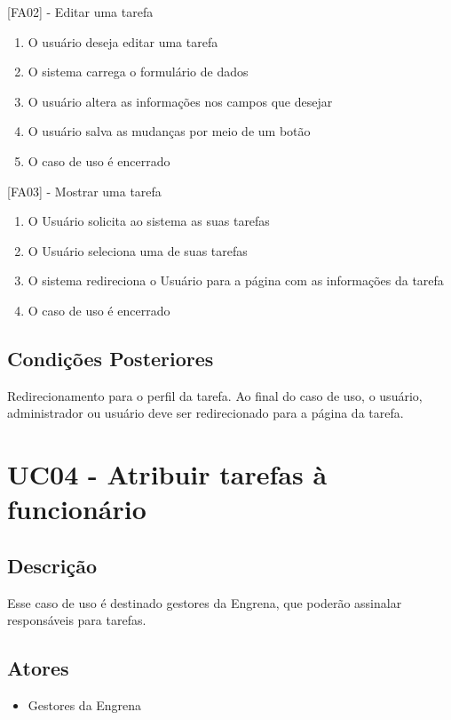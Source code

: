 [FA02] - Editar uma tarefa
\begin{enumerate}
  \item{O usuário deseja editar uma tarefa}
  \item{O sistema carrega o formulário de dados}
  \item{O usuário altera as informações nos campos que desejar}
  \item{O usuário salva as mudanças por meio de um botão}
  \item{O caso de uso é encerrado}
\end{enumerate}


[FA03] - Mostrar uma tarefa
\begin{enumerate}
  \item{O Usuário solicita ao sistema as suas tarefas}
  \item{O Usuário seleciona uma de suas tarefas}
  \item{O sistema redireciona o Usuário para a página com as informações da tarefa}
  \item{O caso de uso é encerrado}
\end{enumerate}


\subsection{Condições Posteriores}

Redirecionamento para o perfil da tarefa. Ao final do caso de uso, o usuário, administrador ou usuário deve ser redirecionado para a página da tarefa.


\section{UC04 - Atribuir tarefas à funcionário}

\subsection{Descrição}

Esse caso de uso é destinado gestores da Engrena, que poderão assinalar responsáveis para tarefas.

\subsection{Atores}

\begin{itemize}
  \item{Gestores da Engrena}
\end{itemize}


